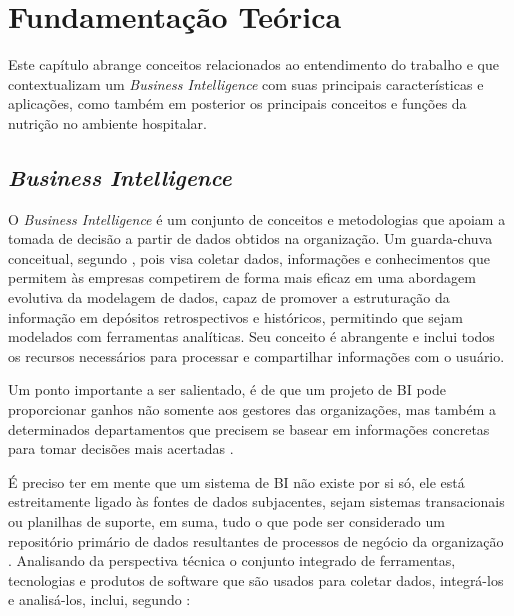 \chapter{Fundamentação Teórica}\label{cap_fundamentos}

Este capítulo abrange conceitos relacionados ao entendimento do trabalho e que contextualizam um \textit{Business Intelligence} com suas principais características e aplicações, como também em posterior os principais conceitos e funções da nutrição no ambiente hospitalar. 

\section{\textit{Business Intelligence}}
O \textit{Business Intelligence} é um conjunto de conceitos e metodologias que apoiam a tomada de decisão a partir de dados obtidos na organização. Um guarda-chuva conceitual, segundo , pois visa coletar dados, informações e conhecimentos que permitem às empresas competirem de forma mais eficaz em uma abordagem evolutiva da modelagem de dados, capaz de promover a estruturação da informação em depósitos retrospectivos e históricos, permitindo que sejam modelados com ferramentas analíticas. Seu conceito é abrangente e inclui todos os recursos necessários para processar e compartilhar informações com o usuário.

Um ponto importante a ser salientado, é de que um projeto de BI pode proporcionar ganhos não somente aos gestores das organizações, mas também a determinados departamentos que precisem se basear em informações concretas para tomar decisões mais acertadas \cite{antonelli2009}.

É preciso ter em mente que um sistema de BI não existe por si só, ele está estreitamente ligado às fontes de dados subjacentes, sejam sistemas transacionais ou planilhas de suporte, em suma, tudo o que pode ser considerado um repositório primário de dados resultantes de processos de negócio da organização \cite{sezoes2006}. Analisando da perspectiva técnica o conjunto integrado de ferramentas, tecnologias e produtos de software que são usados para coletar dados, integrá-los e analisá-los, inclui, segundo :

